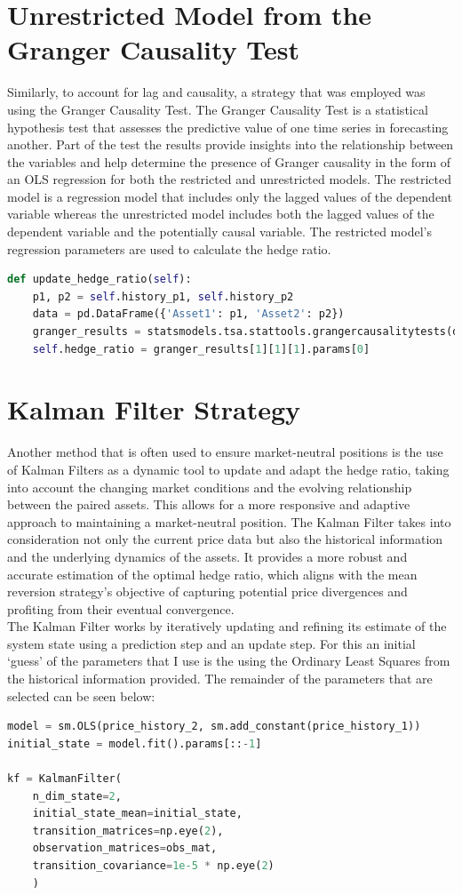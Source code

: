 \section{Unrestricted Model from the Granger Causality Test}
Similarly, to account for lag and causality, a strategy that was employed was using the Granger Causality Test. The Granger Causality Test is a statistical hypothesis test that assesses the predictive value of one time series in forecasting another. Part of the test the results provide insights into the relationship between the variables and help determine the presence of Granger causality in the form of an OLS regression for both the restricted and unrestricted models. The restricted model is a regression model that includes only the lagged values of the dependent variable whereas the unrestricted model includes both the lagged values of the dependent variable and the potentially causal variable. The restricted model's regression parameters are used to calculate the hedge ratio.
\begin{lstlisting}[language=Python]
def update_hedge_ratio(self):
    p1, p2 = self.history_p1, self.history_p2
    data = pd.DataFrame({'Asset1': p1, 'Asset2': p2})
    granger_results = statsmodels.tsa.stattools.grangercausalitytests(data, maxlag=[1], verbose=False)
    self.hedge_ratio = granger_results[1][1][1].params[0]
\end{lstlisting}

\section{Kalman Filter Strategy}
Another method that is often used to ensure market-neutral positions is the use of Kalman Filters as a dynamic tool to update and adapt the hedge ratio, taking into account the changing market conditions and the evolving relationship between the paired assets. This allows for a more responsive and adaptive approach to maintaining a market-neutral position. The Kalman Filter takes into consideration not only the current price data but also the historical information and the underlying dynamics of the assets. It provides a more robust and accurate estimation of the optimal hedge ratio, which aligns with the mean reversion strategy's objective of capturing potential price divergences and profiting from their eventual convergence.
\\[3mm]
The Kalman Filter works by iteratively updating and refining its estimate of the system state using a prediction step and an update step. For this an initial `guess' of the parameters that I use is the using the Ordinary Least Squares from the historical information provided. The remainder of the parameters that are selected can be seen below:
\begin{lstlisting}[language=Python]
model = sm.OLS(price_history_2, sm.add_constant(price_history_1))
initial_state = model.fit().params[::-1]

kf = KalmanFilter(
    n_dim_state=2,
    initial_state_mean=initial_state,
    transition_matrices=np.eye(2),
    observation_matrices=obs_mat,
    transition_covariance=1e-5 * np.eye(2)
    )
\end{lstlisting}
\vspace{5mm}

